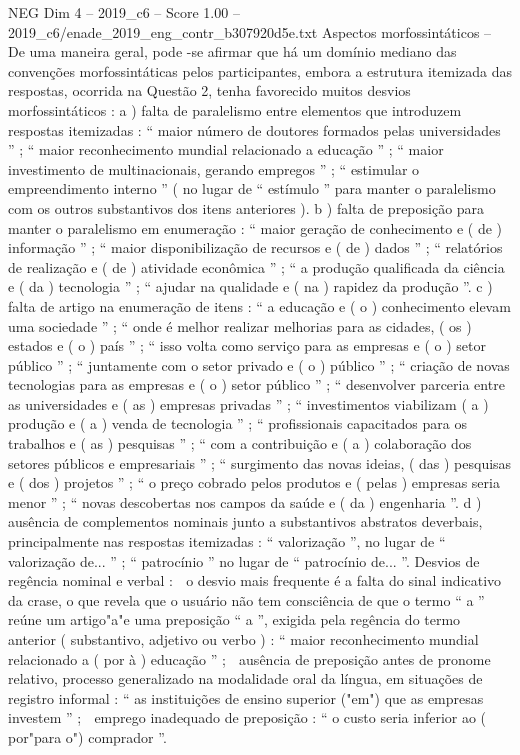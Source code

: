 \begin{textsample}{NEG Dim 4 – 2019\_c6 – Score 1.00 – 2019\_c6/enade\_2019\_eng\_contr\_b307920d5e.txt}
Aspectos morfossintáticos – De uma maneira geral, pode -se afirmar que há um domínio mediano das convenções morfossintáticas pelos participantes, embora a estrutura itemizada das respostas, ocorrida na Questão 2, tenha favorecido muitos desvios morfossintáticos : a ) falta de paralelismo entre elementos que introduzem respostas itemizadas : “ maior número de doutores formados pelas universidades ” ; “ maior reconhecimento mundial relacionado a educação ” ; “ maior investimento de multinacionais, gerando empregos ” ; “ estimular o empreendimento interno ” ( no lugar de “ estímulo ” para manter o paralelismo com os outros substantivos dos itens anteriores ). b ) falta de preposição para manter o paralelismo em enumeração : “ maior geração de conhecimento e ( de ) informação ” ; “ maior disponibilização de recursos e ( de ) dados ” ; “ relatórios de realização e ( de ) atividade econômica ” ; “ a produção qualificada da ciência e ( da ) tecnologia ” ; “ ajudar na qualidade e ( na ) rapidez da produção ”. c ) falta de artigo na enumeração de itens : “ a educação e ( o ) conhecimento elevam uma sociedade ” ; “ onde é melhor realizar melhorias para as cidades, ( os ) estados e ( o ) país ” ; “ isso volta como serviço para as empresas e ( o ) setor público ” ; “ juntamente com o setor privado e ( o ) público ” ; “ criação de novas tecnologias para as empresas e ( o ) setor público ” ; “ desenvolver parceria entre as universidades e ( as ) empresas privadas ” ; “ investimentos viabilizam ( a ) produção e ( a ) venda de tecnologia ” ; “ profissionais capacitados para os trabalhos e ( as ) pesquisas ” ; “ com a contribuição e ( a ) colaboração dos setores públicos e empresariais ” ; “ surgimento das novas ideias, ( das ) pesquisas e ( dos ) projetos ” ; “ o preço cobrado pelos produtos e ( pelas ) empresas seria menor ” ; “ novas descobertas nos campos da saúde e ( da ) engenharia ”. d ) ausência de complementos nominais junto a substantivos abstratos deverbais, principalmente nas respostas itemizadas : “ valorização ”, no lugar de “ valorização de... ” ; “ patrocínio ” no lugar de “ patrocínio de... ”.
Desvios de regência nominal e verbal :  o desvio mais frequente é a falta do sinal indicativo da crase, o que revela que o usuário não tem consciência de que o termo “ a ” reúne um artigo"a"e uma preposição “ a ”, exigida pela regência do termo anterior ( substantivo, adjetivo ou verbo ) : “ maior reconhecimento mundial relacionado a ( por à ) educação ” ;  ausência de preposição antes de pronome relativo, processo generalizado na modalidade oral da língua, em situações de registro informal : “ as instituições de ensino superior ("em") que as empresas investem ” ;  emprego inadequado de preposição : “ o custo seria inferior ao ( por"para o") comprador ”.

\end{textsample}
